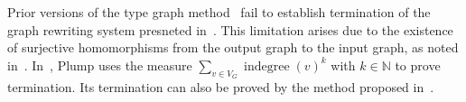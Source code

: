 Prior versions of the type graph method~\cite{bruggink2014termination,bruggink2015proving,endrullis2023generalized} fail to establish termination of the graph rewriting system presneted in~. This limitation arises due to the existence of surjective homomorphisms from the output graph to the input graph, as noted in~\cite{endrullis2023generalized}. In~\cite{plump2018modular}, Plump uses the measure $\sum_{v\in V_G} \operatorname{indegree}(v)^k$ with $k \in \mathbb{N}$ to prove termination. Its termination can also be proved by the method proposed in~\cite{overbeek2023termination}.

